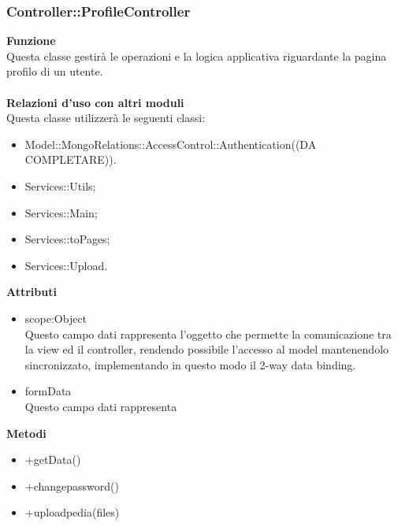 {{\begin{itemize}
					\end{itemize}
				}
				\subsubsection{Controller::ProfileController}{
					\textbf{Funzione}\\
					\indent Questa classe gestirà le operazioni e la logica applicativa riguardante la pagina profilo di un utente.\\\\
					\textbf{Relazioni d'uso con altri moduli}\\
					\indent Questa classe utilizzerà le seguenti classi:
					\begin{itemize}
						\item Model::MongoRelations::AccessControl::Authentication((DA COMPLETARE)).
						\item Services::Utils;
						\item Services::Main;
						\item Services::toPages;
						\item Services::Upload.
					\end{itemize}
					\textbf{Attributi}\\
					\begin{itemize}
					\item scope:Object\\
					Questo campo dati rappresenta l’oggetto che permette la comunicazione tra la view ed il controller, rendendo possibile l’accesso al model mantenendolo sincronizzato, implementando in questo modo il 2-way data binding.
					\item formData\\
					Questo campo dati rappresenta
					\end{itemize}
					\textbf{Metodi}
					\begin{itemize}
                    \item +getData()
                    \item +changepassword()
                    \item +uploadpedia(files)
					\end{itemize}
				}
}
